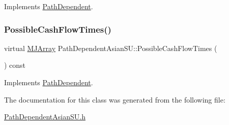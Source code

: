 Implements \hyperlink{classPathDependent_a1ee091a4f3680339683af087dfb4ca0f}{Path\+Dependent}.

\hypertarget{classPathDependentAsianSU_aa9f5c9b0e444fd4dbe50632c1410ae5a}{}\label{classPathDependentAsianSU_aa9f5c9b0e444fd4dbe50632c1410ae5a} 
\subsubsection{\texorpdfstring{Possible\+Cash\+Flow\+Times()}{PossibleCashFlowTimes()}}
{\footnotesize\ttfamily virtual \hyperlink{classMJArray}{M\+J\+Array} Path\+Dependent\+Asian\+S\+U\+::\+Possible\+Cash\+Flow\+Times (\begin{DoxyParamCaption}{ }\end{DoxyParamCaption}) const\hspace{0.3cm}{\ttfamily [virtual]}}



Implements \hyperlink{classPathDependent_a4c8bf82be7f4443c5c8177d7500d542d}{Path\+Dependent}.



The documentation for this class was generated from the following file\+:\begin{DoxyCompactItemize}
\item 
\hyperlink{PathDependentAsianSU_8h}{Path\+Dependent\+Asian\+S\+U.\+h}\end{DoxyCompactItemize}
